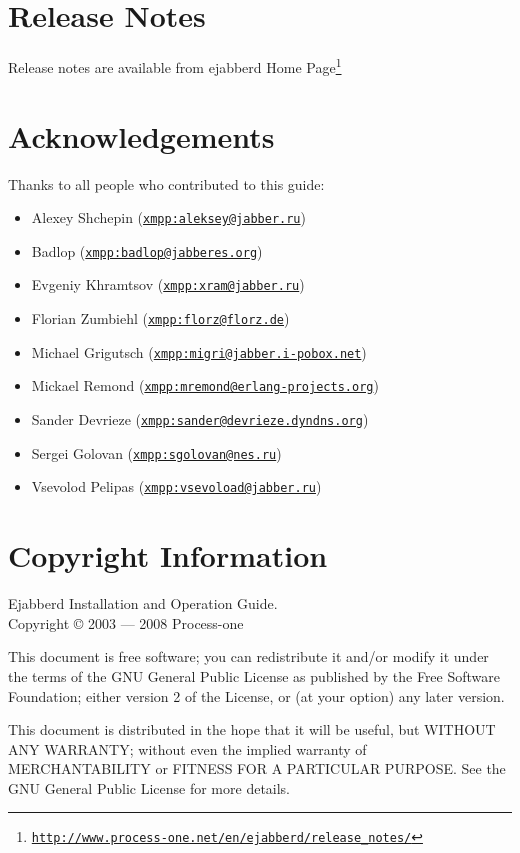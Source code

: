 \documentclass[a4paper,10pt]{book}
\newcommand{\ind}[1]{\begin{latexonly}\index{#1}\end{latexonly}}
\gdef\ahrefurl#1{\href{#1}{\texttt{#1}}}
\gdef\footahref#1#2{#2\footnote{\href{#1}{\texttt{#1}}}}
\begin{document}
\chapter{Release Notes}
\label{releasenotes}
\ind{release notes}

Release notes are available from \footahref{http://www.process-one.net/en/ejabberd/release\_notes/}{ejabberd Home Page}

\chapter{Acknowledgements}
\label{acknowledgements}
Thanks to all people who contributed to this guide:
\begin{itemize}
\item Alexey Shchepin (\ahrefurl{xmpp:aleksey@jabber.ru})
\item Badlop (\ahrefurl{xmpp:badlop@jabberes.org})
\item Evgeniy Khramtsov (\ahrefurl{xmpp:xram@jabber.ru})
\item Florian Zumbiehl (\ahrefurl{xmpp:florz@florz.de})
\item Michael Grigutsch (\ahrefurl{xmpp:migri@jabber.i-pobox.net})
\item Mickael Remond (\ahrefurl{xmpp:mremond@erlang-projects.org})
\item Sander Devrieze (\ahrefurl{xmpp:sander@devrieze.dyndns.org})
\item Sergei Golovan (\ahrefurl{xmpp:sgolovan@nes.ru})
\item Vsevolod Pelipas (\ahrefurl{xmpp:vsevoload@jabber.ru})
\end{itemize}


\chapter{Copyright Information}
\label{copyright}

Ejabberd Installation and Operation Guide.\\
Copyright \copyright{} 2003 --- 2008 Process-one

This document is free software; you can redistribute it and/or
modify it under the terms of the GNU General Public License
as published by the Free Software Foundation; either version 2
of the License, or (at your option) any later version.

This document is distributed in the hope that it will be useful,
but WITHOUT ANY WARRANTY; without even the implied warranty of
MERCHANTABILITY or FITNESS FOR A PARTICULAR PURPOSE. See the
GNU General Public License for more details.
\end{document}
